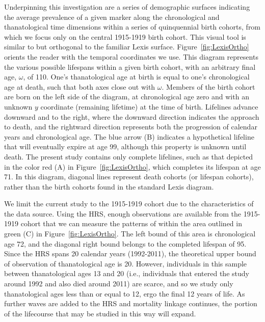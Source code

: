\documentclass[11pt,oneside]{article} %
\begin{document}
Underpinning this investigation are a series of demographic surfaces indicating
the average prevalence of a given marker along the chronological and
thanatological time dimensions within a series of quinquennial birth cohorts, from which we
focus only on the central 1915-1919 birth cohort.
This visual tool is similar to but orthogonal to the familiar Lexis surface.
Figure~\ref{fig:LexisOrtho} orients the reader with the temporal coordinates we
use. This diagram represents the various possible lifespans within a given birth cohort, with an arbitrary final age, $\omega$, of 110. One's
thanatological age at birth is equal to one's chronological age at death, such
that both axes close out with $\omega$. Members of the birth cohort are born on
the left side of the diagram, at chronological age zero and with an unknown $y$ coordinate (remaining lifetime) at the time of birth.
Lifelines advance downward and to the right, where the downward direction indicates the approach to death, and the
rightward direction represents both the progression of calendar years and
chronological age. The blue arrow (B) indicates a hypothetical lifeline that
will eventually expire at age 99, although this property is unknown until death. The
present study contains only complete lifelines, such as that depicted in the
color red (A) in Figure~\ref{fig:LexisOrtho}, which completes its lifespan at
age 71. In this diagram, diagonal lines represent death cohorts (or lifespan
cohorts), rather than the birth cohorts found in the standard Lexis diagram.

We limit the current study to the 1915-1919 cohort due
to the characteristics of the data source. Using the HRS, enough
observations are available from the 1915-1919 cohort that we can measure
the patterns of within the area outlined in green (C) in Figure~\ref{fig:LexisOrtho}. The
left bound of this area is chronological age 72, and the diagonal right
bound belongs to the completed lifespan of 95. Since the HRS spans 20 calendar years (1992-2011), the
theoretical upper bound of observation of thanatological age is 20.
However, individuals in this sample between
thanatological ages 13 and 20 (i.e., individuals that
entered the study around 1992 and also died around 2011) are scarce,
and so we study only thanatological ages less than or equal to 12, ergo the
final 12 years of life. As further waves are added to the HRS and mortality
linkage continues, the portion of the lifecourse that may be studied in this way
will expand.
\end{document}
